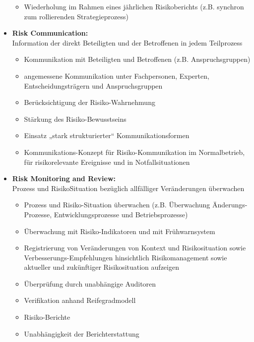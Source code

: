 \documentclass[10pt,a4paper]{article}
\begin{document}
\begin{itemize}[noitemsep,topsep=0pt,leftmargin=*]
\begin{itemize}[noitemsep,topsep=0pt,leftmargin=*]
        \item Wiederholung im Rahmen eines jährlichen Risikoberichts (z.B. synchron zum rollierenden Strategieprozess)
    \end{itemize}
    \item \textbf{Risk Communication:}\\Information der direkt
    Beteiligten und der Betroffenen in jedem Teilprozess
    \begin{itemize}[noitemsep,topsep=0pt,leftmargin=*]
        \item Kommunikation mit Beteiligten und Betroffenen (z.B. Anspruchsgruppen)
        \item angemessene Kommunikation unter Fachpersonen, Experten, Entscheidungsträgern und Anspruchsgruppen
        \item Berücksichtigung der Risiko-Wahrnehmung
        \item Stärkung des Risiko-Bewusstseins
        \item Einsatz „stark strukturierter“ Kommunikationsformen
        \item Kommunikations-Konzept für Risiko-Kommunikation im Normalbetrieb, für risikorelevante Ereignisse und in Notfallsituationen
    \end{itemize}
    \item \textbf{Risk Monitoring and Review:}\\Prozess und RisikoSituation bezüglich allfälliger Veränderungen
    überwachen
    \begin{itemize}[noitemsep,topsep=0pt,leftmargin=*]
        \item Prozess und Risiko-Situation überwachen (z.B. Überwachung Änderungs-Prozesse, Entwicklungsprozesse und Betriebsprozesse)
        \item Überwachung mit Risiko-Indikatoren und mit Frühwarnsystem
        \item Registrierung von Veränderungen von Kontext und Risikosituation sowie Verbesserungs-Empfehlungen hinsichtlich Risikomanagement sowie aktueller und zukünftiger Risikosituation aufzeigen
        \item Überprüfung durch unabhängige Auditoren
        \item Verifikation anhand Reifegradmodell
        \item Risiko-Berichte
        \item Unabhängigkeit der Berichterstattung
    \end{itemize}
\end{itemize}
\end{document}
